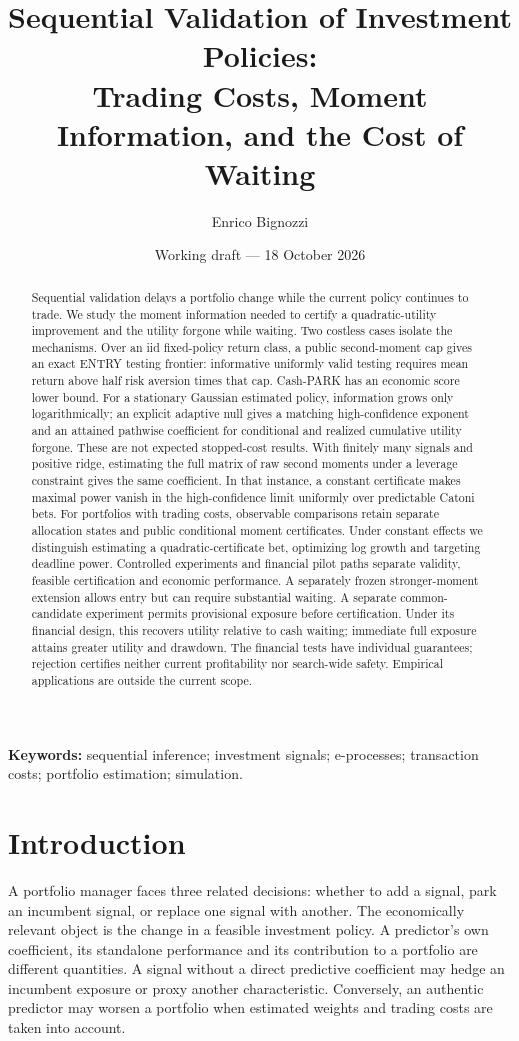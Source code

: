 \documentclass[11pt,a4paper]{article}
\title{Sequential Validation of Investment Policies:\\Trading Costs, Moment Information, and the Cost of Waiting}
\author{Enrico Bignozzi}
\date{Working draft --- 18 October 2026}
\theoremstyle{remark}\newtheorem{remark}[theorem]{Remark}
\begin{document}
\maketitle
\begin{abstract}
Sequential validation delays a portfolio change while the current policy
continues to trade. We study the moment information needed to certify a
quadratic-utility improvement and the utility forgone while waiting. Two
costless cases isolate the mechanisms. Over an iid fixed-policy return class,
a public second-moment cap gives an exact ENTRY testing frontier: informative
uniformly valid testing requires mean return above half risk aversion times
that cap. Cash-PARK has an economic score lower bound. For a stationary
Gaussian estimated policy, information grows only logarithmically; an explicit
adaptive null gives a matching high-confidence exponent and an attained
pathwise coefficient for conditional and realized cumulative utility forgone.
These are not expected stopped-cost results.
With finitely many signals and positive ridge, estimating the full matrix of
raw second moments under a leverage constraint gives the same coefficient.
In that instance, a constant certificate makes maximal power vanish in the high-confidence
limit uniformly over predictable Catoni bets. For portfolios with trading
costs, observable comparisons retain separate allocation states and public
conditional moment certificates. Under constant effects we distinguish
estimating a quadratic-certificate bet, optimizing log growth and targeting
deadline power. Controlled experiments and financial pilot paths separate
validity, feasible certification and economic performance. A separately frozen
stronger-moment extension allows entry but can require substantial waiting.
A separate common-candidate experiment permits provisional exposure before
certification. Under its financial design, this recovers utility relative to
cash waiting; immediate full exposure attains greater utility and drawdown.
The financial tests have individual guarantees; rejection certifies neither
current profitability nor search-wide safety. Empirical applications are
outside the current scope.
\end{abstract}
\noindent\textbf{Keywords:} sequential inference; investment signals; e-processes;
transaction costs; portfolio estimation; simulation.

\section{Introduction}
A portfolio manager faces three related decisions: whether to add a signal,
park an incumbent signal, or replace one signal with another. The economically
relevant object is the change in a feasible investment policy. A predictor's
own coefficient, its standalone performance and its contribution to a
portfolio are different quantities. A signal without a direct predictive
coefficient may hedge an incumbent exposure or proxy another characteristic.
Conversely, an authentic predictor may worsen a portfolio when estimated
weights and trading costs are taken into account.
\end{document}
